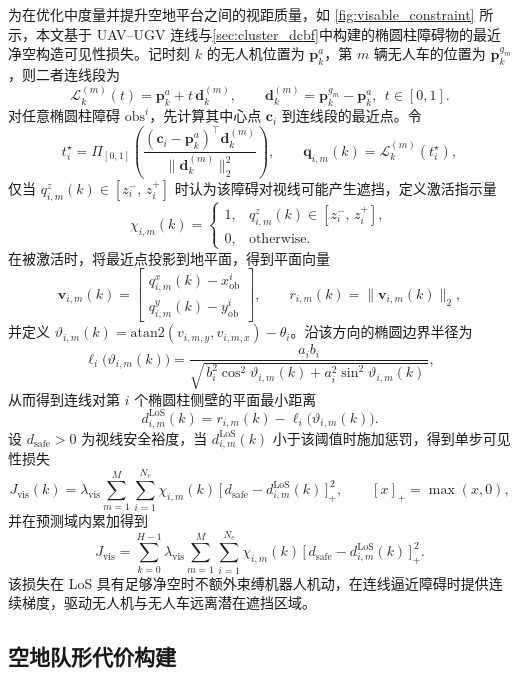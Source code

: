 为在优化中度量并提升空地平台之间的视距质量，如 \autoref{fig:visable_constraint} 所示，本文基于 UAV--UGV 连线与\autoref{sec:cluster_dcbf}中构建的椭圆柱障碍物的最近净空构造可见性损失。记时刻 \(k\) 的无人机位置为 \(\mathbf{p}^{a}_k\)，第 \(m\) 辆无人车的位置为 \(\mathbf{p}^{g_m}_k\)，则二者连线段为
\[
\mathcal{L}^{(m)}_k(t)=\mathbf{p}^{a}_k+t\,\mathbf{d}^{(m)}_k,\qquad 
\mathbf{d}^{(m)}_k=\mathbf{p}^{g_m}_k-\mathbf{p}^{a}_k,\ \ t\in[0,1]. 
\]
对任意椭圆柱障碍 \(\mathrm{obs}^i\)，先计算其中心点 \(\mathbf{c}_i\) 到连线段的最近点。令
\[
t_i^\star=\Pi_{[0,1]}\!\left(\frac{(\mathbf{c}_i-\mathbf{p}^{a}_k)^\top \mathbf{d}^{(m)}_k}{\|\mathbf{d}^{(m)}_k\|_2^2}\right),
\qquad
\mathbf{q}_{i,m}(k)=\mathcal{L}^{(m)}_k(t_i^\star),
\]
仅当 \(q_{i,m}^z(k)\in[z_i^{-},\,z_i^{+}]\) 时认为该障碍对视线可能产生遮挡，定义激活指示量
\[
\chi_{i,m}(k)=
\begin{cases}
1, & q_{i,m}^z(k)\in[z_i^{-},\,z_i^{+}],\\[2pt]
0, & \text{otherwise}.
\end{cases}
\]
在被激活时，将最近点投影到地平面，得到平面向量
\[
\mathbf{v}_{i,m}(k)=
\begin{bmatrix}
q_{i,m}^x(k)-x^{i}_{\mathrm{ob}}\\[2pt]
q_{i,m}^y(k)-y^{i}_{\mathrm{ob}}
\end{bmatrix},\qquad
r_{i,m}(k)=\big\|\mathbf{v}_{i,m}(k)\big\|_2,
\]
并定义 \(\vartheta_{i,m}(k)=\mathrm{atan2}(v_{i,m,y},v_{i,m,x})-\theta_i\)。沿该方向的椭圆边界半径为
\[
\ell_i\big(\vartheta_{i,m}(k)\big)
=\frac{a_i b_i}{\sqrt{\,b_i^{2}\cos^{2}\!\vartheta_{i,m}(k)+a_i^{2}\sin^{2}\!\vartheta_{i,m}(k)\,}},
\]
从而得到连线对第 \(i\) 个椭圆柱侧壁的平面最小距离
\[
d^{\mathrm{LoS}}_{i,m}(k)=r_{i,m}(k)-\ell_i\big(\vartheta_{i,m}(k)\big).
\]
设 \(d_{\mathrm{safe}}>0\) 为视线安全裕度，当 \(d^{\mathrm{LoS}}_{i,m}(k)\) 小于该阈值时施加惩罚，得到单步可见性损失
\[
J_{\mathrm{vis}}(k)=\lambda_{\mathrm{vis}}\sum_{m=1}^{M}\sum_{i=1}^{N_c}
\chi_{i,m}(k)\,\big[\,d_{\mathrm{safe}}-d^{\mathrm{LoS}}_{i,m}(k)\,\big]_+^{\,2},\qquad [x]_+=\max(x,0),
\]
并在预测域内累加得到
\begin{equation}
J_{\mathrm{vis}}
=\sum_{k=0}^{H-1}\lambda_{\mathrm{vis}}\sum_{m=1}^{M}\sum_{i=1}^{N_c}
\chi_{i,m}(k)\,\big[\,d_{\mathrm{safe}}-d^{\mathrm{LoS}}_{i,m}(k)\,\big]_+^{\,2}.
\label{eq:J_vis_total}
\end{equation}
该损失在 LoS 具有足够净空时不额外束缚机器人机动，在连线逼近障碍时提供连续梯度，驱动无人机与无人车远离潜在遮挡区域。

\subsection{空地队形代价构建} \label{sec:formation_constraint1}

